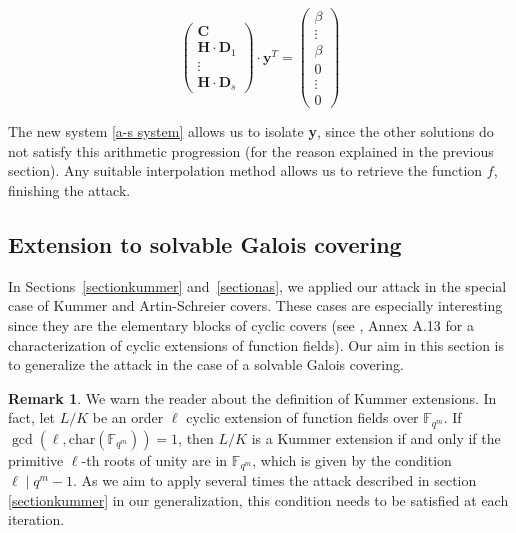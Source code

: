 \documentclass[10pt]{article}
\theoremstyle{definition}
\newtheorem{rq1}[thm]{Remark}
\theoremstyle{definition}
\theoremstyle{definition}
\newcommand{\cd}{\cdot}
\newcommand{\Fqm}{\mathbb{F}_{q^m}}
\begin{document}
\begin{equation} \label{a-s system}
\begin{pmatrix}
\mathbf{C}\\
\mathbf{H} \cd \mathbf{D}_1 \\
\vdots \\
\mathbf{H} \cd \mathbf{D}_s
\end{pmatrix}
\cd \mathbf{y}^T = 
\begin{pmatrix}
\beta \\
\vdots \\
\beta \\
0 \\
\vdots \\
0
\end{pmatrix} 
\end{equation}

The new system \eqref{a-s system} allows us to isolate \textbf{y}, since the other solutions do not satisfy this arithmetic progression (for the reason explained in the previous section). Any suitable interpolation method allows us to retrieve the function $f$, finishing the attack.

\subsection{Extension to solvable Galois covering} \label{solvable}

In Sections~\ref{sectionkummer} and~\ref{sectionas}, we applied our attack in the special case of Kummer and Artin-Schreier covers. These cases are especially interesting since they are the elementary blocks of cyclic covers (see \cite{Sti}, Annex A.13 for a characterization of cyclic extensions of function fields). Our aim in this section is to generalize the attack in the case of a solvable Galois covering.

\begin{rq1} \label{racinesdel'unite}
We warn the reader about the definition of Kummer extensions. In fact, let $L/K$ be an order $\ell$ cyclic extension of function fields over $\Fqm$. If $\gcd(\ell,\mathrm{char}(\Fqm))=1$, then $L/K$ is a Kummer extension if and only if the primitive $\ell$-th roots of unity are in $\Fqm$, which is given by the condition $\ell \mid q^m-1$. As we aim to apply several times the attack described in section \ref{sectionkummer} in our generalization, this condition needs to be satisfied at each iteration.
\end{rq1}
\end{document}
